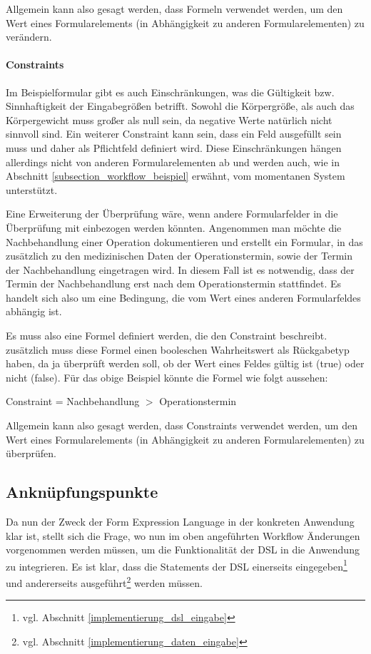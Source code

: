 Allgemein kann also gesagt werden, dass Formeln verwendet werden, um den Wert eines Formularelements (in Abhängigkeit zu anderen Formularelementen) zu verändern.

\paragraph{Constraints}

Im Beispielformular gibt es auch Einschränkungen, was die Gültigkeit bzw. Sinnhaftigkeit der Eingabegrößen betrifft. Sowohl die Körpergröße, als auch das Körpergewicht muss großer als null sein, da negative Werte natürlich nicht sinnvoll sind. Ein weiterer Constraint kann sein, dass ein Feld ausgefüllt sein muss und daher als Pflichtfeld definiert wird. Diese Einschränkungen hängen allerdings nicht von anderen Formularelementen ab und werden auch, wie in Abschnitt \ref{subsection_workflow_beispiel} erwähnt, vom momentanen System unterstützt.

Eine Erweiterung der Überprüfung wäre, wenn andere Formularfelder in die Überprüfung mit einbezogen werden könnten. Angenommen man möchte die Nachbehandlung einer Operation dokumentieren und erstellt ein Formular, in das zusätzlich zu den medizinischen Daten der Operationstermin, sowie der Termin der Nachbehandlung eingetragen wird. In diesem Fall ist es not\-wen\-dig, dass der Termin der Nachbehandlung erst nach dem Operationstermin stattfindet. Es handelt sich also um eine Bedingung, die vom Wert eines anderen Formularfeldes abhängig ist.

Es muss also eine Formel definiert werden, die den Constraint beschreibt. zusätzlich muss diese Formel einen booleschen Wahrheitswert als Rückgabetyp haben, da ja überprüft werden soll, ob der Wert eines Feldes gültig ist (true) oder nicht (false). Für das obige Beispiel könnte die Formel wie folgt aussehen:

\begin{center}
 Constraint = Nachbehandlung $ > $ Operationstermin
\end{center}

Allgemein kann also gesagt werden, dass Constraints verwendet werden, um den Wert eines Formularelements (in Abhängigkeit zu anderen Formularelementen) zu überprüfen.


\subsection{Anknüpfungspunkte}

Da nun der Zweck der Form Expression Language in der konkreten Anwendung klar ist, stellt sich die Frage, wo nun im oben angeführten Workflow Änderungen vorgenommen werden müssen, um die Funktionalität der DSL in die Anwendung zu integrieren. Es ist klar, dass die Statements der DSL einerseits eingegeben\footnote{vgl. Abschnitt \ref{implementierung_dsl_eingabe}  } und andererseits ausgeführt\footnote{vgl. Abschnitt \ref{implementierung_daten_eingabe} } werden müssen. 

